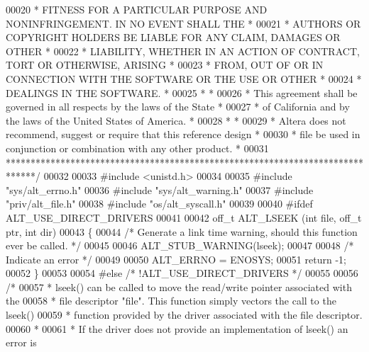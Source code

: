 \begin{DoxyCode}
00020 \textcolor{comment}{* FITNESS FOR A PARTICULAR PURPOSE AND NONINFRINGEMENT. IN NO EVENT SHALL THE *}
00021 \textcolor{comment}{* AUTHORS OR COPYRIGHT HOLDERS BE LIABLE FOR ANY CLAIM, DAMAGES OR OTHER      *}
00022 \textcolor{comment}{* LIABILITY, WHETHER IN AN ACTION OF CONTRACT, TORT OR OTHERWISE, ARISING     *}
00023 \textcolor{comment}{* FROM, OUT OF OR IN CONNECTION WITH THE SOFTWARE OR THE USE OR OTHER         *}
00024 \textcolor{comment}{* DEALINGS IN THE SOFTWARE.                                                   *}
00025 \textcolor{comment}{*                                                                             *}
00026 \textcolor{comment}{* This agreement shall be governed in all respects by the laws of the State   *}
00027 \textcolor{comment}{* of California and by the laws of the United States of America.              *}
00028 \textcolor{comment}{*                                                                             *}
00029 \textcolor{comment}{* Altera does not recommend, suggest or require that this reference design    *}
00030 \textcolor{comment}{* file be used in conjunction or combination with any other product.          *}
00031 \textcolor{comment}{******************************************************************************/}
00032 
00033 \textcolor{preprocessor}{#include <unistd.h>}
00034 
00035 \textcolor{preprocessor}{#include "sys/alt_errno.h"}
00036 \textcolor{preprocessor}{#include "sys/alt_warning.h"}
00037 \textcolor{preprocessor}{#include "priv/alt_file.h"}
00038 \textcolor{preprocessor}{#include "os/alt_syscall.h"}
00039 
00040 \textcolor{preprocessor}{#ifdef ALT\_USE\_DIRECT\_DRIVERS}
00041 
00042 off\_t ALT_LSEEK (\textcolor{keywordtype}{int} file, off\_t ptr, \textcolor{keywordtype}{int} dir)
00043 \{
00044   \textcolor{comment}{/* Generate a link time warning, should this function ever be called. */}
00045   
00046   ALT_STUB_WARNING(lseek);
00047   
00048   \textcolor{comment}{/* Indicate an error */}
00049   
00050   ALT_ERRNO = ENOSYS;
00051   \textcolor{keywordflow}{return} -1;
00052 \}
00053 
00054 \textcolor{preprocessor}{#else }\textcolor{comment}{/* !ALT\_USE\_DIRECT\_DRIVERS */}\textcolor{preprocessor}{}
00055 
00056 \textcolor{comment}{/*}
00057 \textcolor{comment}{ * lseek() can be called to move the read/write pointer associated with the }
00058 \textcolor{comment}{ * file descriptor "file". This function simply vectors the call to the lseek()}
00059 \textcolor{comment}{ * function provided by the driver associated with the file descriptor.}
00060 \textcolor{comment}{ *}
00061 \textcolor{comment}{ * If the driver does not provide an implementation of lseek() an error is}

\end{DoxyCode}
